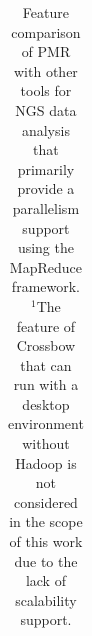 \documentclass{acm_proc_article-sp}
\begin{document}
\begin{center}
\begin{table}[ht]
{\begin{tabular}{|l|l|c|c|c|c|c|c|}
\hline
\end{tabular}}
\hfill{}
\caption{Feature comparison of PMR with other tools for NGS data analysis that primarily provide a parallelism support using the MapReduce framework.  $^{1}${The feature of Crossbow that can run with a desktop environment without Hadoop is not considered in the scope of this work due to the lack of scalability support.} }
 \label{table:mr-comparison}
\end{table}
\end{center}

\end{document}
